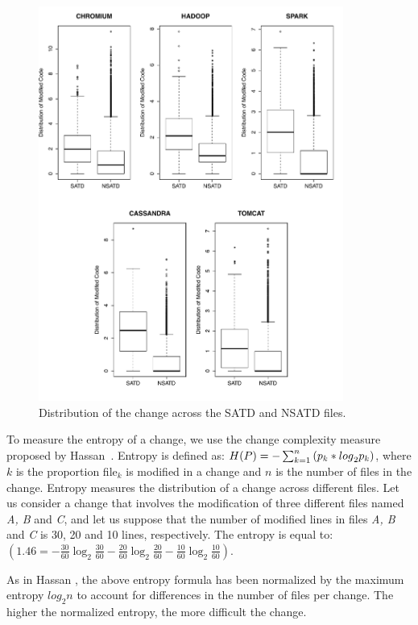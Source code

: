 \begin{figure}[!hp]
	\centering
	\includegraphics[width=100mm]{figures/chapter3/entropy_for_all_projects}
	\caption{Distribution of the change across the SATD and NSATD files.}
	\label{figure:mtdocatdf}
\end{figure}


To measure the entropy of a change, we use the change complexity measure proposed by Hassan~\cite{hassan2009predicting}. Entropy is defined as: $H(P)=-\sum _{k=1}^{n}\textrm ({p}_{k}*{log}_{2} {p}_{k})$, where $k$ is the proportion file$_{k}$ is modified in a change and $n$ is the number of files in the change. Entropy measures the distribution of a change across different files. Let us consider a change that involves the modification of three different files named \textit{A, B} and \textit{C}, and let us suppose that the number of modified lines in files\textit{ A, B} and \textit{C} is 30, 20 and 10 lines, respectively. The entropy is equal to:
$(1.46=-\frac{30}{60}\log_{2}\frac{30}{60}-\frac{20}{60}\log_{2}\frac{20}{60}-\frac{10}{60}\log_{2}\frac{10}{60})$.

As in Hassan \cite{hassan2009predicting}, the above entropy formula has been normalized by the maximum entropy $log_{2}n$ to account for differences in the number of files per change. The higher the normalized entropy, the more difficult the change.




